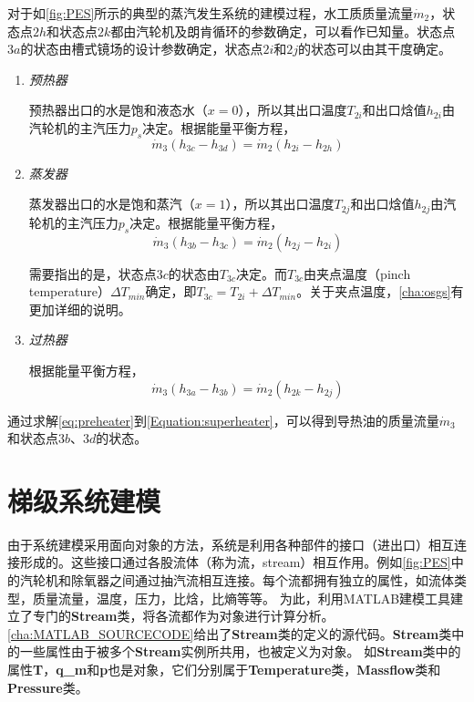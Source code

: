 对于如\autoref{fig:PES}所示的典型的蒸汽发生系统的建模过程，水工质质量流量$\dot{m}_2$，状态点$2h$和状态点$2k$都由汽轮机及朗肯循环的参数确定，可以看作已知量。状态点$3a$的状态由槽式镜场的设计参数确定，状态点$2i$和$2j$的状态可以由其干度确定。

\begin{enumerate}[label=(\arabic*)]
  \item \emph{预热器}
  
预热器出口的水是饱和液态水（$x = 0$），所以其出口温度$T_{2i}$和出口焓值$h_{2i}$由汽轮机的主汽压力$p_s$决定。根据能量平衡方程，
  \begin{equation}
  \dot{m}_3 (h_{3c}-h_{3d})=\dot{m}_2 (h_{2i} - h_{2h})
  \label{eq:preheater}
\end{equation}

  \item \emph{蒸发器}
  
  蒸发器出口的水是饱和蒸汽（$x = 1$），所以其出口温度$T_{2j}$和出口焓值$h_{2j}$由汽轮机的主汽压力$p_s$决定。根据能量平衡方程，
  \begin{equation}
  \dot{m}_3 (h_{3b}-h_{3c})=\dot{m}_2 (h_{2j} - h_{2i})
  \label{eq:evaporator}
\end{equation}

	需要指出的是，状态点$3c$的状态由$T_{3c}$决定。而$T_{3c}$由夹点温度（pinch temperature）$\Delta T_{min}$确定，即$T_{3c} = T_{2i} + \Delta T_{min}$。关于夹点温度，\autoref{cha:osgs}有更加详细的说明。
  
  \item \emph{过热器}
  
  根据能量平衡方程，
  \begin{equation}
  \dot{m}_3 (h_{3a}-h_{3b})=\dot{m}_2 (h_{2k} - h_{2j})
  \label{Equation:superheater}
\end{equation}

\end{enumerate}

通过求解\autoref{eq:preheater}到\autoref{Equation:superheater}，可以得到导热油的质量流量$\dot{m}_3$和状态点$3b$、$3d$的状态。

\section{梯级系统建模}

由于系统建模采用面向对象的方法，系统是利用各种部件的接口（进出口）相互连接形成的。这些接口通过各股流体（称为流，stream）相互作用。例如\autoref{fig:PES}中的汽轮机和除氧器之间通过抽汽流相互连接。每个流都拥有独立的属性，如流体类型，质量流量，温度，压力，比焓，比熵等等。
为此，利用MATLAB建模工具建立了专门的\textbf{Stream}类，将各流都作为对象进行计算分析。\autoref{cha:MATLAB_SOURCECODE}给出了\textbf{Stream}类的定义的源代码。\textbf{Stream}类中的一些属性由于被多个\textbf{Stream}实例所共用，也被定义为对象。
如\textbf{Stream}类中的属性\textbf{T}，\textbf{q\_m}和\textbf{p}也是对象，它们分别属于\textbf{Temperature}类，\textbf{Massflow}类和\textbf{Pressure}类。


